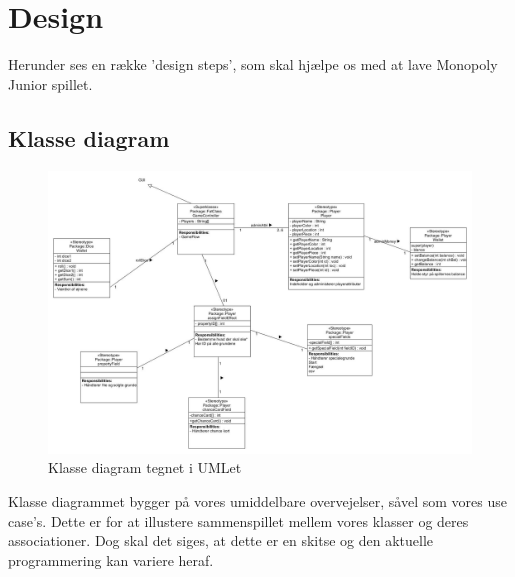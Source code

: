 \section{Design}
    Herunder ses en række 'design steps', som skal hjælpe os med at lave Monopoly 
    Junior spillet.

    \subsection{Klasse diagram}
            \begin{figure}[h]
                \advance\leftskip-3cm
                \includegraphics[width=20cm]{fig/Designklassediagram(3).jpg}
                \caption{Klasse diagram tegnet i UMLet}
            \end{figure}
        Klasse diagrammet bygger på vores umiddelbare overvejelser, såvel som vores use case's.
        Dette er for at illustere sammenspillet mellem vores klasser og deres associationer.
        Dog skal det siges, at dette er en skitse og den aktuelle programmering kan variere heraf.
        \pagebreak
    
